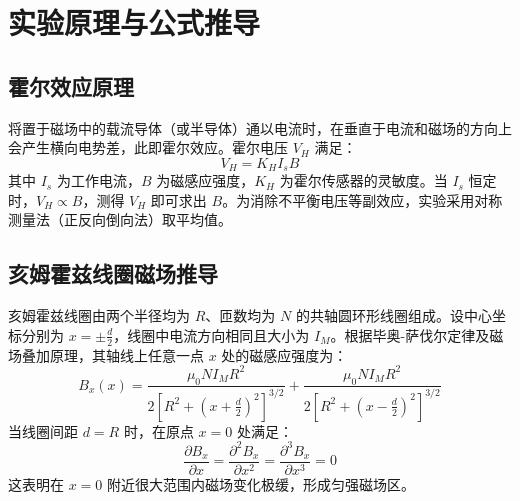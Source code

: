 \documentclass[a4paper, 10pt]{ctexart}
\begin{document}
	
	\section{实验原理与公式推导}
	
	\subsection{霍尔效应原理}
	将置于磁场中的载流导体（或半导体）通以电流时，在垂直于电流和磁场的方向上会产生横向电势差，此即霍尔效应。霍尔电压 $V_H$ 满足：
	\begin{equation}
		V_H = K_H I_s B
	\end{equation}
	其中 $I_s$ 为工作电流，$B$ 为磁感应强度，$K_H$ 为霍尔传感器的灵敏度。当 $I_s$ 恒定时，$V_H \propto B$，测得 $V_H$ 即可求出 $B$。为消除不平衡电压等副效应，实验采用对称测量法（正反向倒向法）取平均值。
	
	\subsection{亥姆霍兹线圈磁场推导}
	亥姆霍兹线圈由两个半径均为 $R$、匝数均为 $N$ 的共轴圆环形线圈组成。设中心坐标分别为 $x = \pm \frac{d}{2}$，线圈中电流方向相同且大小为 $I_M$。根据毕奥-萨伐尔定律及磁场叠加原理，其轴线上任意一点 $x$ 处的磁感应强度为：
	\begin{equation}
		B_x(x) = \frac{\mu_0 N I_M R^2}{2\left[R^2 + \left(x+\frac{d}{2}\right)^2\right]^{3/2}} + \frac{\mu_0 N I_M R^2}{2\left[R^2 + \left(x-\frac{d}{2}\right)^2\right]^{3/2}}
	\end{equation}
	当线圈间距 $d = R$ 时，在原点 $x=0$ 处满足：
	\begin{equation*}
		\frac{\partial B_x}{\partial x} = \frac{\partial^2 B_x}{\partial x^2} = \frac{\partial^3 B_x}{\partial x^3} = 0
	\end{equation*}
	这表明在 $x=0$ 附近很大范围内磁场变化极缓，形成匀强磁场区。
	
\end{document}
